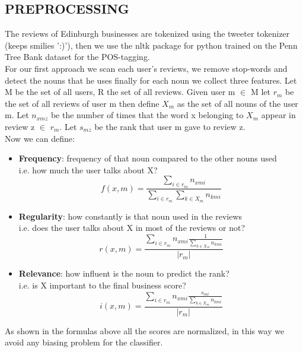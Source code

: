 \documentclass[11pt]{article}
\begin{document}
\subsection{PREPROCESSING}
The reviews of Edinburgh businesses are tokenized using the tweeter tokenizer (keeps smilies ':)'), then we use the nltk package for python trained on the  Penn Tree Bank dataset for the POS-tagging.\\
For our first approach we scan each user's reviews, we remove stop-words and detect the nouns that he uses finally for each noun we collect three features.
Let M be the set of all users, R the set of all reviews.
Given user m $\in$ M let $r_m$ be the set of all reviews of user m then define $X_m$ as the set of all nouns of the user m.
Let $n_{xmz}$ be the number of times that the word x belonging to $X_m$ appear in review z $\in$ $r_m.$
Let $s_{mz}$ be the rank that user m gave to review z.\\
Now we can define:
\begin{itemize}
	\item \textbf{Frequency}: frequency of that noun compared to the other nouns used\\
	i.e. how much the user talks about X?
	\[ f(x,m)= \frac{\sum_{i \in r_m}n_{xmi}}{\sum_{i \in r_m}\sum_{k \in X_m} n_{kmi}} \]
	\item \textbf{Regularity}: how constantly is that noun used in the reviews\\
	i.e. does the user talks about X in most of the reviews or not?
	\[ r(x,m)= \frac{\sum_{i \in r_m}
		n_{xmi}  \frac{1}{\sum_{k \in X_m}n_{kmi}}}	
	{|r_m|} \]
	\item \textbf{Relevance}: how influent is the noun to predict the rank?\\
	i.e. is X important to the final business score?
	\[ i(x,m)= \frac{\sum_{i \in r_m}
		n_{xmi}  \frac{s_{mi}}{\sum_{k \in X_m}n_{kmi}}}	
	{|r_m|} \]
\end{itemize}
As shown in the formulas above all the scores are normalized, in this way we avoid any biasing problem for the classifier.\\
\end{document}
